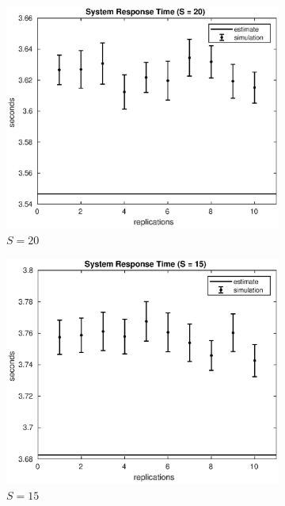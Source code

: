 \begin{figure}[!h]
\centering
%
\begin{subfigure}[t]{0.49\textwidth}
\includegraphics[width=\textwidth]{figures/simul/20_500K_s}
\caption{$S = 20$}
\label{20_s}
\end{subfigure}
%
\begin{subfigure}[t]{0.49\textwidth}
\includegraphics[width=\textwidth]{figures/simul/15_500K_s}
\caption{$S = 15$}
\label{15_s}
\end{subfigure}
%
\begin{subfigure}[t]{0.49\textwidth}

\end{subfigure}
\end{figure}
